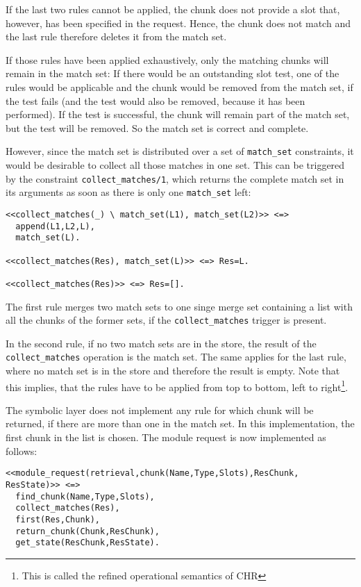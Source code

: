 If the last two rules cannot be applied, the chunk does not provide a slot that, however, has been specified in the request. Hence, the chunk does not match and the last rule therefore deletes it from the match set. 

If those rules have been applied exhaustively, only the matching chunks will remain in the match set: If there would be an outstanding slot test, one of the rules would be applicable and the chunk would be removed from the match set, if the test fails (and the test would also be removed, because it has been performed). If the test is successful, the chunk will remain part of the match set, but the test will be removed. So the match set is correct and complete.

However, since the match set is distributed over a set of \lstinline|match_set| constraints, it would be desirable to collect all those matches in one set. This can be triggered by the constraint \lstinline|collect_matches/1|, which returns the complete match set in its arguments as soon as there is only one \lstinline|match_set| left:

\begin{lstlisting}
<<collect_matches(_) \ match_set(L1), match_set(L2)>> <=> 
  append(L1,L2,L), 
  match_set(L).
  
<<collect_matches(Res), match_set(L)>> <=> Res=L.

<<collect_matches(Res)>> <=> Res=[].
\end{lstlisting}

The first rule merges two match sets to one singe merge set containing a list with all the chunks of the former sets, if the \lstinline|collect_matches| trigger is present. 

In the second rule, if no two match sets are in the store, the result of the \lstinline|collect_matches| operation is the match set. The same applies for the last rule, where no match set is in the store and therefore the result is empty. Note that this implies, that the rules have to be applied from top to bottom, left to right\footnote{This is called the refined operational semantics of CHR}.

The symbolic layer does not implement any rule for which chunk will be returned, if there are more than one in the match set. In this implementation, the first chunk in the list is chosen. The module request is now implemented as follows:

\begin{lstlisting}
<<module_request(retrieval,chunk(Name,Type,Slots),ResChunk, ResState)>> <=> 
  find_chunk(Name,Type,Slots),
  collect_matches(Res),
  first(Res,Chunk),
  return_chunk(Chunk,ResChunk),
  get_state(ResChunk,ResState).
\end{lstlisting}

